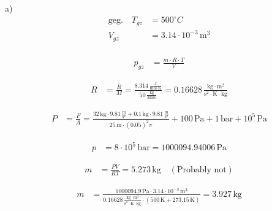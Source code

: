 a) \\
\begin{align*}
\text{geg.} \quad T_{gz} &= 500^\circ C \\
V_{gz} &= 3.14 \cdot 10^{-3} \, \text{m}^3 \\
\end{align*}

\begin{align*}
p_{gz} &= \frac{m \cdot R \cdot T}{V}
\end{align*}

\begin{align*}
R &= \frac{\bar{R}}{M} = \frac{8.314 \, \frac{\text{J}}{\text{mol} \cdot \text{K}}}{50 \, \frac{\text{kg}}{\text{kmol}}} = 0.16628 \, \frac{\text{kg} \cdot \text{m}^2}{\text{s}^2 \cdot \text{K} \cdot \text{kg}}
\end{align*}

\begin{align*}
P &= \frac{F}{A} = \frac{32 \, \text{kg} \cdot 9.81 \, \frac{\text{m}}{\text{s}^2} + 0.1 \, \text{kg} \cdot 9.81 \, \frac{\text{m}}{\text{s}^2}}{25 \, \text{m} \cdot (0.05)^2 \pi} + 100 \, \text{Pa} + 1 \, \text{bar} + 10^5 \, \text{Pa}
\end{align*}

\begin{align*}
p &= 8 \cdot 10^5 \, \text{bar} = 1 000 094.94006 \, \text{Pa}
\end{align*}

\begin{align*}
m &= \frac{PV}{RT} = 5.273 \, \text{kg} \quad (\text{Probably not})
\end{align*}

\begin{align*}
m &= \frac{1 000 094.9 \, \text{Pa} \cdot 3.14 \cdot 10^{-3} \, \text{m}^3}{0.16628 \, \frac{\text{kg} \cdot \text{m}^2}{\text{s}^2 \cdot \text{K} \cdot \text{kg}} \cdot (500 \, \text{K} + 273.15 \, \text{K})} = 3.927 \, \text{kg}
\end{align*}